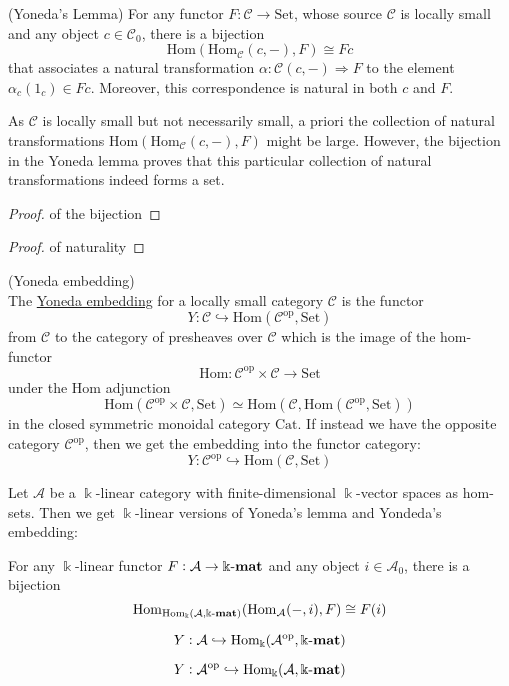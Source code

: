 \begin{lemma}{(Yoneda's Lemma)}
For any functor $F : \mathcal{C} \rightarrow \mathrm{Set}$, whose source $\mathcal{C}$ is locally small and any
object $c \in \mathcal{C}_{0}$, there is a bijection
\[
\mathrm{Hom}(\mathrm{Hom}_{\mathcal{C}}(c,-), F) \cong Fc
\]
that associates a natural transformation $\alpha : \mathcal{C}(c,-) \Rightarrow F$ to the element $\alpha_{c}(1_{c}) \in Fc$.
Moreover, this correspondence is natural in both $c$ and $F$.
\end{lemma}
As $\mathcal{C}$ is locally small but not necessarily small, a priori the collection of natural transformations
$\mathrm{Hom}(\mathrm{Hom}_{\mathcal{C}}(c,-),F)$ might be large. However, the bijection in the Yoneda lemma proves that this particular
collection of natural transformations indeed forms a set.
\begin{proof}{of the bijection}

\end{proof}
\begin{proof}{of naturality}

\end{proof}

\begin{definition}{(Yoneda embedding)}\label{def:yoneda_embedding}\\
The \ul{Yoneda embedding} for a locally small category $\mathcal{C}$ is the functor
\[
Y : \mathcal{C} \hookrightarrow \mathrm{Hom}(\mathcal{C}^{\text{op}}, \mathrm{Set})
\]
from $\mathcal{C}$ to the category of presheaves over $\mathcal{C}$ which is the image of the hom-functor
\[
\mathrm{Hom} : \mathcal{C}^{\text{op}}\times\mathcal{C} \rightarrow \mathrm{Set}
\]
under the $\mathrm{Hom}$ adjunction
\[
\mathrm{Hom}(\mathcal{C}^{\text{op}}\times\mathcal{C}, \mathrm{Set}) \simeq
\mathrm{Hom}(\mathcal{C},\mathrm{Hom}(\mathcal{C}^{\text{op}}, \mathrm{Set}))
\]
in the closed symmetric monoidal category $\mathrm{Cat}$.
If instead we have the opposite category $\mathcal{C}^{\text{op}}$, then we get the embedding into the functor category:
\[
Y : \mathcal{C}^{\text{op}} \hookrightarrow \mathrm{Hom}(\mathcal{C},\mathrm{Set})
\]
\end{definition}

\begin{remark}
Let $\mathcal{A}$ be a $\Bbbk$-linear category with finite-dimensional $\Bbbk$-vector spaces as hom-sets. Then we get
$\Bbbk$-linear versions of Yoneda's lemma and Yondeda's embedding:

For any $\Bbbk$-linear functor $F : \mathcal{A} \rightarrow \Bbbk\textnormal{-}\mathbf{mat}$ and any object $i \in \mathcal{A}_{0}$, there is a bijection
\[
\mathrm{Hom}_{\mathrm{Hom_{\Bbbk}}(\mathcal{A},\Bbbk\textnormal{-}\mathbf{mat})}(\mathrm{Hom}_{\mathcal{A}}(-,i), F) \cong F(i)
\]

\[
Y : \mathcal{A} \hookrightarrow \mathrm{Hom_{\Bbbk}}(\mathcal{A^{\text{op}}},\Bbbk\textnormal{-}\mathbf{mat})
\]

\[
Y : \mathcal{A}^{\text{op}} \hookrightarrow \mathrm{Hom_{\Bbbk}}(\mathcal{A},\Bbbk\textnormal{-}\mathbf{mat})
\]

\end{remark}

